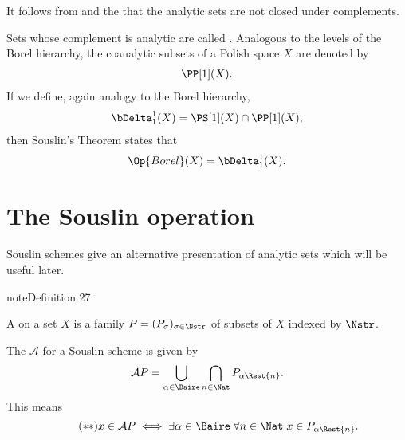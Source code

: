 \documentclass[letterpaper,10pt,english]{jupyterBook}
\begin{document}
\sphinxAtStartPar
It follows from {\hyperref[\detokenize{imagesBorel:thm-Souslin-Borel-images}]{}} and the {\hyperref[\detokenize{analytic:thm-Lusin-separation}]{}} that the analytic sets are not closed under complements.

\sphinxAtStartPar
Sets whose complement is analytic are called . Analogous to the levels of the Borel hierarchy, the co\sphinxhyphen{}analytic subsets of a Polish space \(X\) are denoted by
\begin{equation*}
\begin{split}
	\PP[1](X).
\end{split}
\end{equation*}
\sphinxAtStartPar
If we define, again analogy to the Borel hierarchy,
\begin{equation*}
\begin{split}
	\bDelta^1_1(X) = \PS[1](X) \cap \PP[1](X),
\end{split}
\end{equation*}
\sphinxAtStartPar
then Souslin’s Theorem states that
\begin{equation*}
\begin{split}
	\Op{Borel}(X) = \bDelta^1_1(X).
\end{split}
\end{equation*}

\section{The Souslin operation}
\label{\detokenize{analytic:the-souslin-operation}}
\sphinxAtStartPar
Souslin schemes give an alternative presentation of analytic sets which will be useful later.
\label{analytic:definition-5}
\begin{sphinxadmonition}{note}{Definition 27}



\sphinxAtStartPar
A  on a set \(X\) is a family \(P = (P_\sigma)_{\sigma\in \Nstr}\) of subsets of \(X\) indexed by \(\Nstr\).

\sphinxAtStartPar
The  \(\mathcal{A}\) for a Souslin scheme is given by
\begin{equation*}
\begin{split}
    \mathcal{A}P = \bigcup_{\alpha \in \Baire}  \bigcap_{n \in \Nat} P_{\alpha\Rest{n}}.
\end{split}
\end{equation*}
\sphinxAtStartPar
This means
\begin{equation*} \tag{$**$}
    x \in \mathcal{A}P \iff \exists \alpha \in \Baire \; \forall n \in \Nat \; x \in P_{\alpha\Rest{n}}.
\end{equation*}\end{sphinxadmonition}
\end{document}
